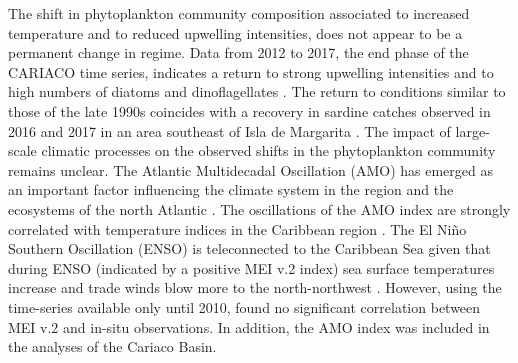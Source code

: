 \documentclass[draft]{agujournal2019}
\begin{document}
    The shift in phytoplankton community composition associated to increased temperature and to reduced upwelling intensities, does not appear to be a permanent change in regime. Data from 2012 to 2017, the end phase of the CARIACO time series, indicates a return to strong upwelling intensities and to high numbers of diatoms and dinoflagellates \cite{muller-karger_scientific_2019}. The return to conditions similar to those of the late 1990s coincides with a recovery in sardine catches observed in 2016 and 2017 in an area southeast of Isla de Margarita \cite{gomez_gaspar_variacion_2025}. 
    The impact of large-scale climatic processes on the observed shifts in the phytoplankton community remains unclear. The Atlantic Multidecadal Oscillation (AMO) has emerged as an important factor influencing the climate system in the region and the ecosystems of the north Atlantic \cite{nye_ecosystem_2014}. The oscillations of the AMO index are strongly correlated with temperature indices in the Caribbean region \cite{stephenson_changes_2014}.
    The El Niño Southern Oscillation (ENSO) is teleconnected to the Caribbean Sea given that during ENSO (indicated by a positive MEI v.2 index) sea surface temperatures increase and trade winds blow more to the north-northwest \cite{enfield_tropical_1997}. However, using the time-series available only until 2010,  found no significant correlation between MEI v.2 and in-situ observations. In addition, the AMO index was included in the analyses of the Cariaco Basin.
\end{document}
